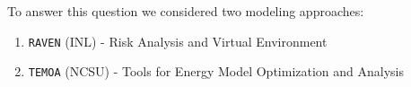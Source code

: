 \begin{frame}
    To answer this question we considered two modeling approaches:
    \begin{enumerate}
      \item \texttt{RAVEN} (INL) - Risk Analysis and Virtual Environment \cite{baker_optimal_2018}\cite{}
      \item \texttt{TEMOA} (NCSU) - Tools for Energy Model Optimization and Analysis \cite{decarolis_temoa_2010}
    \end{enumerate}
\end{frame}
